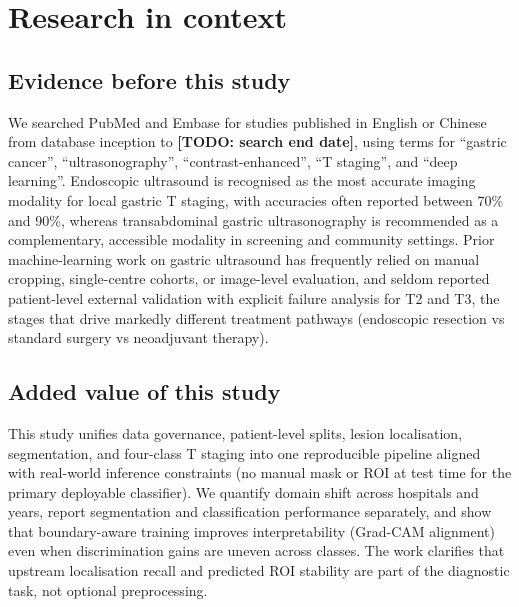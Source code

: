 \documentclass[11pt,a4paper]{article}
\newcommand{\todo}[1]{\textbf{[TODO: #1]}}
\begin{document}
\begin{abstract}
\noindent\textbf{Interpretation}\par
A staged deep learning pipeline can provide patient-level T-stage discrimination on oral contrast-enhanced gastric ultrasonography without manual ROI at inference, but performance degrades across centres and remains weakest for T2. Clinical deployment should be framed as triage to endoscopic ultrasound or cross-sectional staging rather than replacement. Prospective impact studies and explicit cost-sensitive decision thresholds are needed before implementation.

\noindent\textbf{Funding}\par
\todo{Funding sources and funder role in study design, data collection, analysis, and publication decision.}
\end{abstract}

\section*{Research in context}

\subsection*{Evidence before this study}
We searched PubMed and Embase for studies published in English or Chinese from database inception to \todo{search end date}, using terms for ``gastric cancer'', ``ultrasonography'', ``contrast-enhanced'', ``T staging'', and ``deep learning''. Endoscopic ultrasound is recognised as the most accurate imaging modality for local gastric T staging, with accuracies often reported between 70\% and 90\%, whereas transabdominal gastric ultrasonography is recommended as a complementary, accessible modality in screening and community settings. Prior machine-learning work on gastric ultrasound has frequently relied on manual cropping, single-centre cohorts, or image-level evaluation, and seldom reported patient-level external validation with explicit failure analysis for T2 and T3, the stages that drive markedly different treatment pathways (endoscopic resection vs standard surgery vs neoadjuvant therapy).

\subsection*{Added value of this study}
This study unifies data governance, patient-level splits, lesion localisation, segmentation, and four-class T staging into one reproducible pipeline aligned with real-world inference constraints (no manual mask or ROI at test time for the primary deployable classifier). We quantify domain shift across hospitals and years, report segmentation and classification performance separately, and show that boundary-aware training improves interpretability (Grad-CAM alignment) even when discrimination gains are uneven across classes. The work clarifies that upstream localisation recall and predicted ROI stability are part of the diagnostic task, not optional preprocessing.
\end{document}

